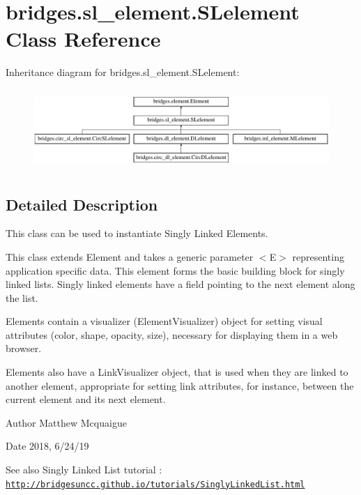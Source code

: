 \hypertarget{classbridges_1_1sl__element_1_1_s_lelement}{}\section{bridges.\+sl\+\_\+element.\+S\+Lelement Class Reference}
\label{classbridges_1_1sl__element_1_1_s_lelement}
Inheritance diagram for bridges.\+sl\+\_\+element.\+S\+Lelement\+:\begin{figure}[H]
\begin{center}
\leavevmode
\includegraphics[height=3.085400cm]{classbridges_1_1sl__element_1_1_s_lelement}
\end{center}
\end{figure}


\subsection{Detailed Description}
This class can be used to instantiate Singly Linked Elements. 

This class extends Element and takes a generic parameter $<$\+E$>$ representing application specific data. This element forms the basic building block for singly linked lists. Singly linked elements have a field pointing to the next element along the list.

Elements contain a visualizer (Element\+Visualizer) object for setting visual attributes (color, shape, opacity, size), necessary for displaying them in a web browser.

Elements also have a Link\+Visualizer object, that is used when they are linked to another element, appropriate for setting link attributes, for instance, between the current element and its next element.

\begin{DoxyAuthor}{Author}
Matthew Mcquaigue 
\end{DoxyAuthor}
\begin{DoxyDate}{Date}
2018, 6/24/19
\end{DoxyDate}
\begin{DoxySeeAlso}{See also}
Singly Linked List tutorial \+: \href{http://bridgesuncc.github.io/tutorials/SinglyLinkedList.html}{\tt http\+://bridgesuncc.\+github.\+io/tutorials/\+Singly\+Linked\+List.\+html} 
\end{DoxySeeAlso}

